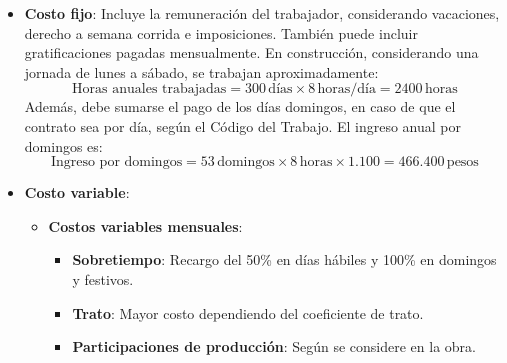 \begin{itemize}
    \item \textbf{Costo fijo}: Incluye la remuneración del trabajador, considerando vacaciones, derecho a semana corrida e imposiciones. También puede incluir gratificaciones pagadas mensualmente. En construcción, considerando una jornada de lunes a sábado, se trabajan aproximadamente:
    \begin{equation}
        \text{Horas anuales trabajadas} = 300 \, \text{días} \times 8 \, \text{horas/día} = 2400 \, \text{horas}
    \end{equation}
    Además, debe sumarse el pago de los días domingos, en caso de que el contrato sea por día, según el Código del Trabajo. El ingreso anual por domingos es:
    \begin{equation}
    \text{Ingreso por domingos} = 53 \, \text{domingos} \times 8 \, \text{horas} \times 1.100 = 466.400 \, \text{pesos}
    \end{equation}
    \item \textbf{Costo variable}: 
    \begin{itemize}
        \item \textbf{Costos variables mensuales}:
        \begin{itemize}
            \item \textbf{Sobretiempo}: Recargo del 50\% en días hábiles y 100\% en domingos y festivos.
            \item \textbf{Trato}: Mayor costo dependiendo del coeficiente de trato.
            \item \textbf{Participaciones de producción}: Según se considere en la obra.
        \end{itemize}
        

\end{itemize}
\end{itemize}
